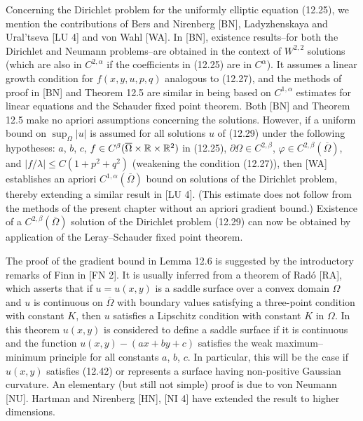 \noindent Concerning the Dirichlet problem for the uniformly elliptic equation (12.25), we mention the contributions of Bers and Nirenberg [BN], Ladyzhenskaya and Ural'tseva [LU 4] and von Wahl [WA]. In [BN], existence results--for both the Dirichlet and Neumann problems--are obtained in the context of $W^{2,2}$ solutions (which are also in $C^{2,\alpha}$ if the coefficients in (12.25) are in $C^{\alpha}$). It assumes a linear growth condition for $f(x,y,u,p,q)$ analogous to (12.27), and the methods of proof in [BN] and Theorem 12.5 are similar in being based on $C^{1,\alpha}$ estimates for linear equations and the Schauder fixed point theorem. Both [BN] and Theorem 12.5 make no apriori assumptions concerning the solutions. However, if a uniform bound on $\sup_{\Omega}|u|$ is assumed for all solutions $u$ of (12.29) under the following hypotheses: $a$, $b$, $c$, $f\in C^{\beta}(\overline{\Omega}\times \mathbb{R}\times \mathbb{R}^{2})$ in (12.25), $\partial\Omega\in C^{2,\beta}$, $\varphi\in C^{2,\beta}(\overline{\Omega})$, and $|f/\lambda|\leq C(1+p^{2}+q^{2})$ (weakening the condition (12.27)), then [WA] establishes an apriori $C^{1,\alpha}(\overline{\Omega})$ bound on solutions of the Dirichlet problem, thereby extending a similar result in [LU 4]. (This estimate does not follow from the methods of the present chapter without an apriori gradient bound.) Existence of a $C^{2,\beta}(\overline{\Omega})$ solution of the Dirichlet problem (12.29) can now be obtained by application of the Leray--Schauder fixed point theorem.

\noindent The proof of the gradient bound in Lemma 12.6 is suggested by the introductory remarks of Finn in [FN 2]. It is usually inferred from a theorem of Rad\'o [RA], which asserts that if $u=u(x,y)$ is a saddle surface over a convex domain $\Omega$ and $u$ is continuous on $\overline{\Omega}$ with boundary values satisfying a three-point condition with constant $K$, then $u$ satisfies a Lipschitz condition with constant $K$ in $\Omega$. In this theorem $u(x,y)$ is considered to define a saddle surface if it is continuous and the function $u(x,y)-(ax+by+c)$ satisfies the weak maximum--minimum principle for all constants $a$, $b$, $c$. In particular, this will be the case if $u(x,y)$ satisfies (12.42) or represents a surface having non-positive Gaussian curvature. An elementary (but still not simple) proof is due to von Neumann [NU]. Hartman and Nirenberg [HN], [NI 4] have extended the result to higher dimensions.



